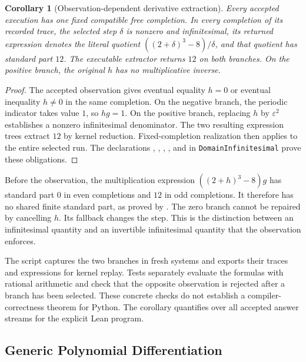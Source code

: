 \documentclass[11pt,a4paper]{article}
\theoremstyle{result}
\newtheorem{corollary}{Corollary}
\theoremstyle{definition}
\newcommand{\code}[1]{\texttt{#1}}
\begin{document}
\begin{corollary}[Observation-dependent derivative extraction]\label{cor:adaptive-derivative}
  Every accepted execution has one fixed compatible free completion. In every completion of its recorded trace, the selected step $\delta$ is nonzero and infinitesimal, its returned expression denotes the literal quotient $((2+\delta)^3-8)/\delta$, and that quotient has standard part $12$. The executable extractor returns $12$ on both branches. On the positive branch, the original $h$ has no multiplicative inverse.
\end{corollary}
\begin{proof}
  The accepted observation gives eventual equality $h=0$ or eventual inequality $h\ne0$ in the same completion. On the negative branch, the periodic indicator takes value $1$, so $hg=1$. On the positive branch, replacing $h$ by $\varepsilon^2$ establishes a nonzero infinitesimal denominator. The two resulting expression trees extract $12$ by kernel reduction. Fixed-completion realization then applies to the entire selected run. The declarations , , , , and  in \code{DomainInfinitesimal} prove these obligations.
\end{proof}

Before the observation, the multiplication expression $((2+h)^3-8)g$ has standard part $0$ in even completions and $12$ in odd completions. It therefore has no shared finite standard part, as proved by . The zero branch cannot be repaired by cancelling $h$. Its fallback changes the step. This is the distinction between an infinitesimal quantity and an invertible infinitesimal quantity that the observation enforces.

The script  captures the two branches in fresh systems and exports their traces and expressions for kernel replay. Tests separately evaluate the formulas with rational arithmetic and check that the opposite observation is rejected after a branch has been selected. These concrete checks do not establish a compiler-correctness theorem for Python. The corollary quantifies over all accepted answer streams for the explicit Lean program.

\subsection{Generic Polynomial Differentiation}
\end{document}
